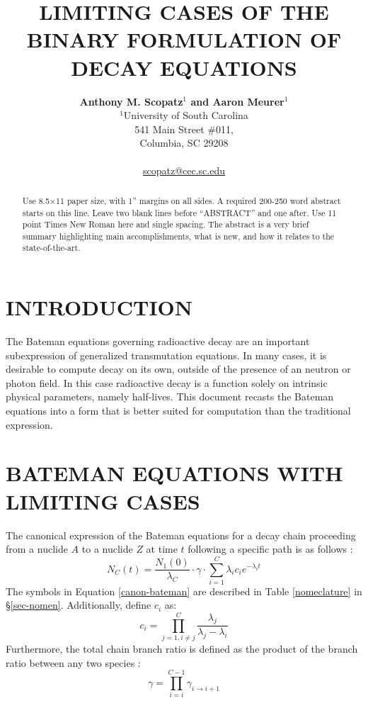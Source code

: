 \documentclass[letterpaper]{physor2018}
\title{LIMITING CASES OF THE BINARY FORMULATION OF DECAY EQUATIONS}
\author{%
  \textbf{Anthony M. Scopatz$^1$ and Aaron Meurer$^1$}\\
  $^1$University of South Carolina \\
  541 Main Street \#011, \\
  Columbia, SC 29208 \\
  \\
  \url{scopatz@cec.sc.edu}
}
\begin{document}
\maketitle
\justify

\begin{abstract}
  Use 8.5$\times$11 paper size, with 1'' margins on all sides.  A required 200-250
  word abstract starts on this line.  Leave two blank lines before ``ABSTRACT''
  and one after.  Use 11 point Times New Roman here and single
  spacing. The abstract is a very brief summary highlighting main
  accomplishments, what is new, and how it relates to the state-of-the-art.
\end{abstract}

\section{INTRODUCTION}
\label{sec-intro}
The Bateman equations governing radioactive decay are an important subexpression
of generalized transmutation equations. In many cases, it is desirable to compute
decay on its own, outside of the presence of an neutron or photon field.  In this
case radioactive decay is a function solely on intrinsic physical parameters,
namely half-lives. This document recasts the Bateman equations into a form that
is better suited for computation than the traditional expression.

\section{BATEMAN EQUATIONS WITH LIMITING CASES}
\label{sec-normal-method}
The canonical expression of the Bateman equations for a decay chain
proceeding from a nuclide $A$ to a nuclide $Z$ at time
$t$ following a specific path is as follows \cite{CETNAR2006640}:
\begin{equation}
\label{canon-bateman}
N_C(t) = \frac{N_1(0)}{\lambda_C} \cdot \gamma \cdot \sum_{i=1}^C \lambda_i c_{i} e^{-\lambda_i t}
\end{equation}
The symbols in Equation \ref{canon-bateman} are described in Table \ref{nomeclature} in
\S\ref{sec-nomen}. Additionally, define $c_{i}$ as:
\begin{equation}
\label{c_i-def}
c_i = \prod_{j=1,i\ne j}^C \frac{\lambda_j}{\lambda_j - \lambda_i}
\end{equation}
Furthermore, the total chain branch ratio is defined as the product of the
branch ratio between any two species \cite{harr2007precise}:
\begin{equation}
\label{gamma-total}
\gamma = \prod_{i=i}^{C-1} \gamma_{i \to i+1}
\end{equation}
\end{document}
